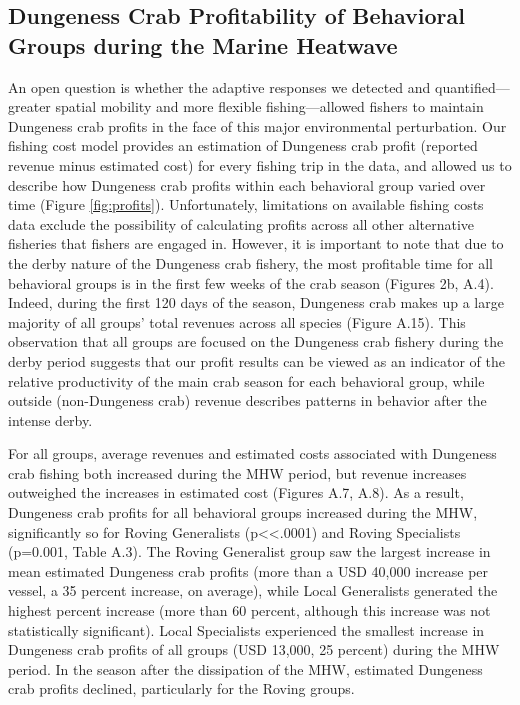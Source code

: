 \documentclass[]{elsarticle} %
\begin{document}
\hypertarget{dungeness-crab-profitability-of-behavioral-groups-during-the-marine-heatwave}{%
\subsection{Dungeness Crab Profitability of Behavioral Groups during the
Marine
Heatwave}\label{dungeness-crab-profitability-of-behavioral-groups-during-the-marine-heatwave}}

An open question is whether the adaptive responses we detected and
quantified---greater spatial mobility and more flexible
fishing---allowed fishers to maintain Dungeness crab profits in the face
of this major environmental perturbation. Our fishing cost model
provides an estimation of Dungeness crab profit (reported revenue minus
estimated cost) for every fishing trip in the data, and allowed us to
describe how Dungeness crab profits within each behavioral group varied
over time (Figure \ref{fig:profits}). Unfortunately, limitations on
available fishing costs data exclude the possibility of calculating
profits across all other alternative fisheries that fishers are engaged
in. However, it is important to note that due to the derby nature of the
Dungeness crab fishery, the most profitable time for all behavioral
groups is in the first few weeks of the crab season (Figures 2b, A.4).
Indeed, during the first 120 days of the season, Dungeness crab makes up
a large majority of all groups' total revenues across all species
(Figure A.15). This observation that all groups are focused on the
Dungeness crab fishery during the derby period suggests that our profit
results can be viewed as an indicator of the relative productivity of
the main crab season for each behavioral group, while outside
(non-Dungeness crab) revenue describes patterns in behavior after the
intense derby.

For all groups, average revenues and estimated costs associated with
Dungeness crab fishing both increased during the MHW period, but revenue
increases outweighed the increases in estimated cost (Figures A.7, A.8).
As a result, Dungeness crab profits for all behavioral groups increased
during the MHW, significantly so for Roving Generalists
(p\textless\textless.0001) and Roving Specialists (p=0.001, Table A.3).
The Roving Generalist group saw the largest increase in mean estimated
Dungeness crab profits (more than a USD 40,000 increase per vessel, a 35
percent increase, on average), while Local Generalists generated the
highest percent increase (more than 60 percent, although this increase
was not statistically significant). Local Specialists experienced the
smallest increase in Dungeness crab profits of all groups (USD 13,000,
25 percent) during the MHW period. In the season after the dissipation
of the MHW, estimated Dungeness crab profits declined, particularly for
the Roving groups.
\end{document}
